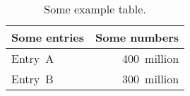 \begin{table}[t]
 \caption{Some example table.}
 \label{table-example}
 \centering
 \small
 \begin{tabular}{@{}lr@{}}
  \toprule
  Some entries & Some numbers \\
  \midrule
  Entry~A      & 400~million  \\
  Entry~B      & 300~million  \\
  \bottomrule
 \end{tabular}
\end{table}
